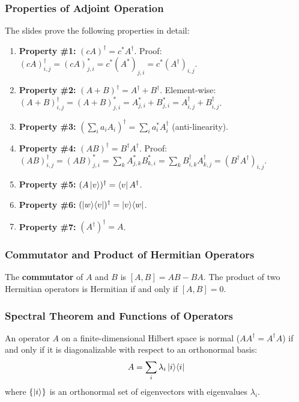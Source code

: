 \documentclass[10pt,a4paper]{article}
\begin{document}
\subsubsection*{Properties of Adjoint Operation}

The slides prove the following properties in detail:
\begin{enumerate}[nosep]
\item \textbf{Property \#1:} $(cA)^\dagger = c^*A^\dagger$. Proof: $(cA)^\dagger_{i,j} = (cA)^*_{j,i} = c^*(A^*)_{j,i} = c^*(A^\dagger)_{i,j}$.
\item \textbf{Property \#2:} $(A+B)^\dagger = A^\dagger+B^\dagger$. Element-wise: $(A+B)^\dagger_{i,j} = (A+B)^*_{j,i} = A^*_{j,i}+B^*_{j,i} = A^\dagger_{i,j}+B^\dagger_{i,j}$.
\item \textbf{Property \#3:} $(\sum_i a_i A_i)^\dagger = \sum_i a_i^* A_i^\dagger$ (anti-linearity).
\item \textbf{Property \#4:} $(AB)^\dagger = B^\dagger A^\dagger$. Proof: $(AB)^\dagger_{i,j} = (AB)^*_{j,i} = \sum_k A^*_{j,k}B^*_{k,i} = \sum_k B^\dagger_{i,k}A^\dagger_{k,j} = (B^\dagger A^\dagger)_{i,j}$.
\item \textbf{Property \#5:} $(A\ket{v})^\dagger = \bra{v}A^\dagger$.
\item \textbf{Property \#6:} $(\ket{w}\!\bra{v})^\dagger = \ket{v}\!\bra{w}$.
\item \textbf{Property \#7:} $(A^\dagger)^\dagger = A$.
\end{enumerate}

\subsubsection*{Commutator and Product of Hermitian Operators}

\begin{tcolorbox}[defstyle, title={Definition: Commutator}]
The \textbf{commutator} of $A$ and $B$ is $[A,B]=AB-BA$. The product of two Hermitian operators is Hermitian if and only if $[A,B]=0$.
\end{tcolorbox}


\subsubsection*{Spectral Theorem and Functions of Operators}

\begin{tcolorbox}[propstyle, title={Spectral Theorem (Finite Dimensional)}]
An operator $A$ on a finite-dimensional Hilbert space is normal ($AA^\dagger=A^\dagger A$) if and only if it is diagonalizable with respect to an orthonormal basis:
\[
A=\sum_i\lambda_i\ket{i}\!\bra{i}
\]
where $\{\ket{i}\}$ is an orthonormal set of eigenvectors with eigenvalues $\lambda_i$.
\end{tcolorbox}
\end{document}
